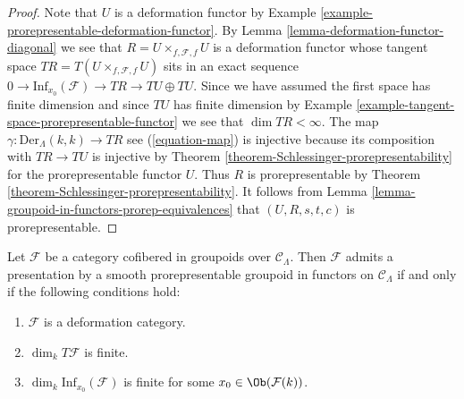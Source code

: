 \begin{proof}
Note that $U$ is a deformation functor by
Example \ref{example-prorepresentable-deformation-functor}.
By
Lemma \ref{lemma-deformation-functor-diagonal}
we see that $R = U \times_{f, \mathcal{F}, f} U$
is a deformation functor whose tangent space
$TR = T(U \times_{f, \mathcal{F}, f} U)$ sits in an exact sequence
$0 \to \text{Inf}_{x_0}(\mathcal{F}) \to TR \to TU \oplus TU$.
Since we have assumed the first space has finite dimension and since
$TU$ has finite dimension by
Example \ref{example-tangent-space-prorepresentable-functor}
we see that $\dim TR < \infty$. The map
$\gamma : \text{Der}_\Lambda(k, k) \to TR$ see (\ref{equation-map})
is injective because its composition with $TR \to TU$ is injective by
Theorem \ref{theorem-Schlessinger-prorepresentability}
for the prorepresentable functor $U$. Thus $R$ is prorepresentable by
Theorem \ref{theorem-Schlessinger-prorepresentability}.
It follows from
Lemma \ref{lemma-groupoid-in-functors-prorep-equivalences}
that $(U, R, s, t, c)$ is prorepresentable.
\end{proof}

\begin{theorem}
\label{theorem-presentation-deformation-groupoid}
Let $\mathcal{F}$ be a category cofibered in groupoids over
$\mathcal{C}_\Lambda$. Then $\mathcal{F}$ admits a presentation by a
smooth prorepresentable groupoid in functors on $\mathcal{C}_\Lambda$
if and only if the following conditions hold:
\begin{enumerate}
\item $\mathcal{F}$ is a deformation category.
\item $\dim_k T\mathcal{F}$ is finite.
\item $\dim_k \text{Inf}_{x_0}(\mathcal{F})$ is finite for some
$x_0 \in \Ob(\mathcal{F}(k))$.
\end{enumerate}
\end{theorem}

